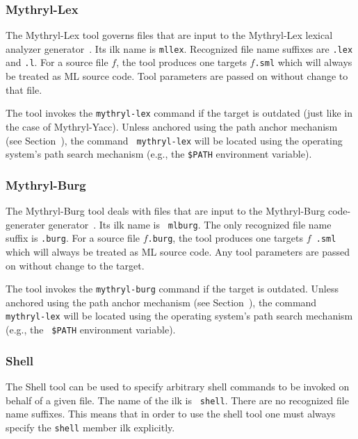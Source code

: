\subsubsection{Mythryl-Lex}

The Mythryl-Lex tool governs files that are input to the Mythryl-Lex lexical
analyzer generator~\cite{appel89:lex}.  Its ilk name is {\tt mllex}.
Recognized file name suffixes are {\tt .lex} and {\tt .l}.  For a
source file $f$, the tool produces one targets $f${\tt .sml} which
will always be treated as ML source code.  Tool parameters are passed
on without change to that file.

The tool invokes the {\tt mythryl-lex} command if the target is outdated
(just like in the case of Mythryl-Yacc).  Unless anchored using the path
anchor mechanism (see Section~), the command {\tt
mythryl-lex} will be located using the operating system's path search
mechanism (e.g., the {\tt \$PATH} environment variable).

\subsubsection{Mythryl-Burg}

The Mythryl-Burg tool deals with files that are input to the Mythryl-Burg
code-generater generator~\cite{mlburg93}.  Its ilk name is {\tt
mlburg}.  The only recognized file name suffix is {\tt .burg}.  For a
source file $f${\tt .burg}, the tool produces one targets $f${\tt
.sml} which will always be treated as ML source code.  Any tool
parameters are passed on without change to the target.

The tool invokes the {\tt mythryl-burg} command if the target is outdated.
Unless anchored using the path anchor mechanism (see
Section~), the command {\tt mythryl-lex} will be located
using the operating system's path search mechanism (e.g., the {\tt
\$PATH} environment variable).

\subsubsection{Shell}

The Shell tool can be used to specify arbitrary shell commands to be
invoked on behalf of a given file.  The name of the ilk is {\tt
shell}.  There are no recognized file name suffixes.  This means that
in order to use the shell tool one must always specify the {\tt shell}
member ilk explicitly.

